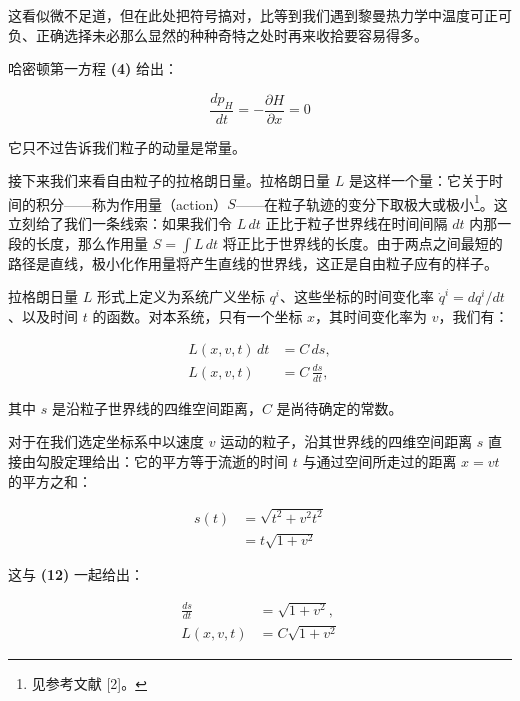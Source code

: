 这看似微不足道，但在此处把符号搞对，比等到我们遇到黎曼热力学中温度可正可负、正确选择未必那么显然的种种奇特之处时再来收拾要容易得多。

哈密顿第一方程 \textbf{(4)} 给出：

\begin{equation}
\frac{dp_{H}}{dt} = -\frac{\partial H}{\partial x} = 0 \tag{11}
\end{equation}

它只不过告诉我们粒子的动量是常量。

接下来我们来看自由粒子的拉格朗日量。拉格朗日量 $L$ 是这样一个量：它关于时间的积分——称为作用量（action）$S$——在粒子轨迹的变分下取极大或极小\footnote{见参考文献 [2]。}。这立刻给了我们一条线索：如果我们令 $L\,dt$ 正比于粒子世界线在时间间隔 $dt$ 内那一段的长度，那么作用量 $S=\int L\,dt$ 将正比于世界线的长度。由于两点之间最短的路径是直线，极小化作用量将产生直线的世界线，这正是自由粒子应有的样子。

拉格朗日量 $L$ 形式上定义为系统广义坐标 $q^{i}$、这些坐标的时间变化率 $\dot{q}^{i}=dq^{i}/dt$、以及时间 $t$ 的函数。对本系统，只有一个坐标 $x$，其时间变化率为 $v$，我们有：

\begin{equation}
\begin{aligned}
L(x,v,t)\,dt &= C\,ds,\\
L(x,v,t) &= C\,\frac{ds}{dt},
\end{aligned}
\tag{12}
\end{equation}

其中 $s$ 是沿粒子世界线的四维空间距离，$C$ 是尚待确定的常数。

对于在我们选定坐标系中以速度 $v$ 运动的粒子，沿其世界线的四维空间距离 $s$ 直接由勾股定理给出：它的平方等于流逝的时间 $t$ 与通过空间所走过的距离 $x=vt$ 的平方之和：

\begin{equation}
\begin{aligned}
s(t) &= \sqrt{t^{2} + v^{2}t^{2}}\\
&= t\sqrt{1+v^{2}}
\end{aligned}
\tag{13}
\end{equation}

这与 \textbf{(12)} 一起给出：

\begin{equation}
\begin{aligned}
\frac{ds}{dt} &= \sqrt{1+v^{2}},\\
L(x,v,t) &= C\sqrt{1+v^{2}}
\end{aligned}
\tag{14}
\end{equation}


